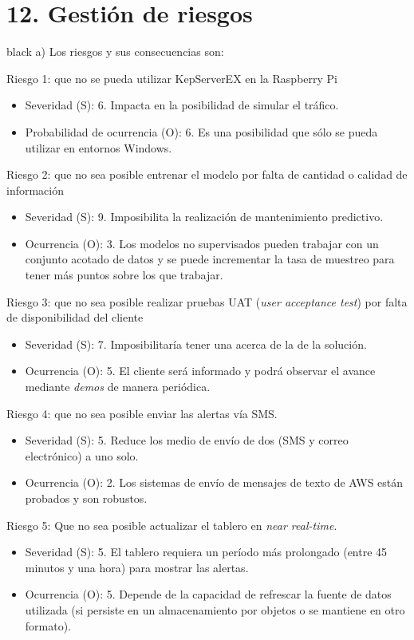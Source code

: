 \documentclass[11pt]{charter}
\begin{document}
\section{12. Gestión de riesgos}
\label{sec:riesgos}

\begin{consigna}{black}
a) Los riesgos y sus consecuencias son:
 
Riesgo 1: que no se pueda utilizar KepServerEX en la Raspberry Pi
\begin{itemize}
\item Severidad (S): 6. Impacta en la posibilidad de simular el tráfico.
\item Probabilidad de ocurrencia (O): 6. Es una posibilidad que sólo se pueda utilizar en entornos Windows.

\end{itemize}   

Riesgo 2: que no sea posible entrenar el modelo por falta de cantidad o calidad de información
\begin{itemize}
\item Severidad (S): 9. Imposibilita la realización de mantenimiento predictivo.
\item Ocurrencia (O): 3. Los modelos no supervisados pueden trabajar con un conjunto acotado de datos y se puede incrementar la tasa de muestreo para tener más puntos sobre los que trabajar.
\end{itemize}

Riesgo 3: que no sea posible realizar pruebas UAT (\textit{user acceptance test}) por falta de disponibilidad del cliente
\begin{itemize}
\item Severidad (S): 7. Imposibilitaría tener una acerca de la de la solución.
\item Ocurrencia (O): 5. El cliente será informado y podrá observar el avance mediante \textit{demos} de manera periódica.
\end{itemize}

Riesgo 4: que no sea posible enviar las alertas vía SMS.
\begin{itemize}
\item Severidad (S): 5. Reduce los medio de envío de dos (SMS y correo electrónico) a uno solo.
\item Ocurrencia (O): 2. Los sistemas de envío de mensajes de texto de AWS están probados y son robustos.
\end{itemize}

Riesgo 5: Que no sea posible actualizar el tablero en \textit{near real-time}.
\begin{itemize}
\item Severidad (S): 5. El tablero requiera un período más prolongado (entre 45 minutos y una hora) para mostrar las alertas.
\item Ocurrencia (O): 5. Depende de la capacidad de refrescar la fuente de datos utilizada (si persiste en un almacenamiento por objetos o se mantiene en otro formato).
\end{itemize}


\end{consigna}
\end{document}
